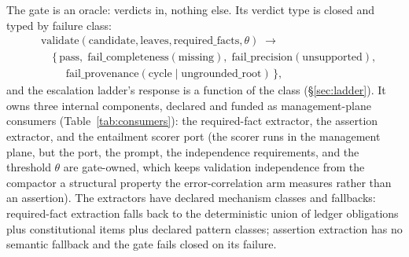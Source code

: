 \documentclass[11pt]{article}
\begin{document}
The gate is an oracle: verdicts in, nothing else. Its verdict type is closed and typed by failure class:
\[
\begin{aligned}
&\mathrm{validate}(\mathrm{candidate}, \mathrm{leaves}, \mathrm{required\_facts}, \theta) \;\to\\
&\quad\{\,\mathrm{pass},\; \mathrm{fail\_completeness}(\mathrm{missing}),\;
\mathrm{fail\_precision}(\mathrm{unsupported}),\\
&\qquad\; \mathrm{fail\_provenance}(\mathrm{cycle} \mid \mathrm{ungrounded\_root})\,\},
\end{aligned}
\]
and the escalation ladder's response is a function of the class (\S\ref{sec:ladder}). It owns three internal components, declared and funded as management-plane consumers (Table~\ref{tab:consumers}): the required-fact extractor, the assertion extractor, and the entailment scorer port (the scorer runs in the management plane, but the port, the prompt, the independence requirements, and the threshold $\theta$ are gate-owned, which keeps validation independence from the compactor a structural property the error-correlation arm measures rather than an assertion). The extractors have declared mechanism classes and fallbacks: required-fact extraction falls back to the deterministic union of ledger obligations plus constitutional items plus declared pattern classes; assertion extraction has no semantic fallback and the gate fails closed on its failure.
\end{document}
